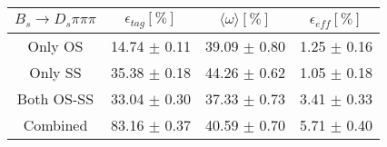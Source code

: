 \begin{tabular}{c c c c}
\hline
\hline
$ B_s \to D_s \pi \pi \pi$ & $\epsilon_{tag} [\%]$ & $\langle \omega \rangle [\%] $ & $\epsilon_{eff} [\%]$ \\
\hline
Only OS & 14.74 $\pm$ 0.11 & 39.09 $\pm$ 0.80 & 1.25 $\pm$ 0.16\\
Only SS & 35.38 $\pm$ 0.18 & 44.26 $\pm$ 0.62 & 1.05 $\pm$ 0.18\\
Both OS-SS & 33.04 $\pm$ 0.30 & 37.33 $\pm$ 0.73 & 3.41 $\pm$ 0.33\\
\hline
Combined & 83.16 $\pm$ 0.37 & 40.59 $\pm$ 0.70 & 5.71 $\pm$ 0.40\\
\hline
\hline
\end{tabular}
